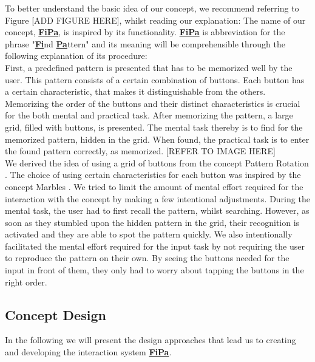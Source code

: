 To better understand the basic idea of our concept, we recommend referring to Figure [ADD FIGURE HERE], whilst reading our explanation: 
The name of our concept, \underline{\textbf{FiPa}}, is inspired by its functionality. \underline{\textbf{FiPa}} is abbreviation for the phrase "\underline{\textbf{Fi}}nd \underline{\textbf{Pa}}ttern" and its meaning will be comprehensible through the following explanation of its procedure: \\
First, a predefined pattern is presented that has to be memorized well by the user. This pattern consists of a certain combination of buttons. Each button has a certain characteristic, that makes it distinguishable from the others. Memorizing the order of the buttons and their distinct characteristics is crucial for the both mental and practical task. After memorizing the pattern, a large grid, filled with buttons, is presented. The mental task thereby is to find for the memorized pattern, hidden in the grid. When found, the practical task is to enter the found pattern correctly, as memorized. [REFER TO IMAGE HERE]\\

We derived the idea of using a grid of buttons from the concept Pattern Rotation \cite{patternRotation, anonymous}. The choice of using certain characteristics for each button was inspired by the concept Marbles \cite{patternRotation, anonymous}. We  tried to limit the amount of mental effort required for the interaction with the concept by making a few intentional adjustments. During the mental task, the user had to first recall the pattern, whilst searching. However, as soon as they stumbled upon the hidden pattern in the grid, their recognition is activated and they are able to spot the pattern quickly. We also intentionally facilitated the mental effort required for the input task by not requiring the user to reproduce the pattern on their own. By seeing the buttons needed for the input in front of them, they only had to worry about tapping the buttons in the right order.

\subsection{Concept Design}
In the following we will present the design approaches that lead us to creating and developing the interaction system \underline{\textbf{FiPa}}.

